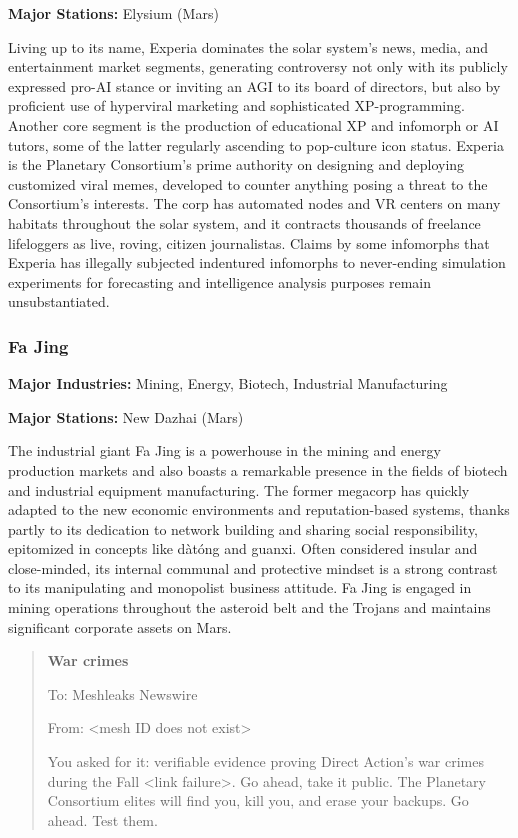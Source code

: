 \textbf{Major Stations:} Elysium (Mars)


Living up to its name, Experia dominates the solar system's news,
media, and entertainment market segments, generating controversy not
only with its publicly expressed pro-AI stance or inviting an AGI to
its board of directors, but also by proficient use of hyperviral
marketing and sophisticated XP-programming. Another core segment is
the production of educational XP and infomorph or AI tutors, some of
the latter regularly ascending to pop-culture icon status.  Experia is
the Planetary Consortium's prime authority on designing and deploying
customized viral memes, developed to counter anything posing a threat
to the Consortium's interests. The corp has automated nodes and VR
centers on many habitats throughout the solar system, and it contracts
thousands of freelance lifeloggers as live, roving, citizen
journalistas. Claims by some infomorphs that Experia has illegally
subjected indentured infomorphs to never-ending simulation experiments
for forecasting and intelligence analysis purposes remain
unsubstantiated.

\subsubsection{Fa Jing}
\label{sec:fa-jing}

\textbf{Major Industries:} Mining, Energy, Biotech, Industrial Manufacturing

\textbf{Major Stations:} New Dazhai (Mars)


The industrial giant Fa Jing is a powerhouse in the mining and energy
production markets and also boasts a remarkable presence in the fields
of biotech and industrial equipment manufacturing. The former megacorp
has quickly adapted to the new economic environments and
reputation-based systems, thanks partly to its dedication to network
building and sharing social responsibility, epitomized in concepts
like dàtóng and guanxi. Often considered insular and close-minded, its
internal communal and protective mindset is a strong contrast to its
manipulating and monopolist business attitude. Fa Jing is engaged in
mining operations throughout the asteroid belt and the Trojans and
maintains significant corporate assets on Mars.

\begin{quotation}
  \textbf{War crimes}
  
  To: Meshleaks Newswire

  From: <mesh ID does not exist>

  
  You asked for it: verifiable evidence proving Direct Action's war
  crimes during the Fall <link failure>. Go ahead, take it public. The
  Planetary Consortium elites will find you, kill you, and erase your
  backups. Go ahead. Test them.
\end{quotation}

